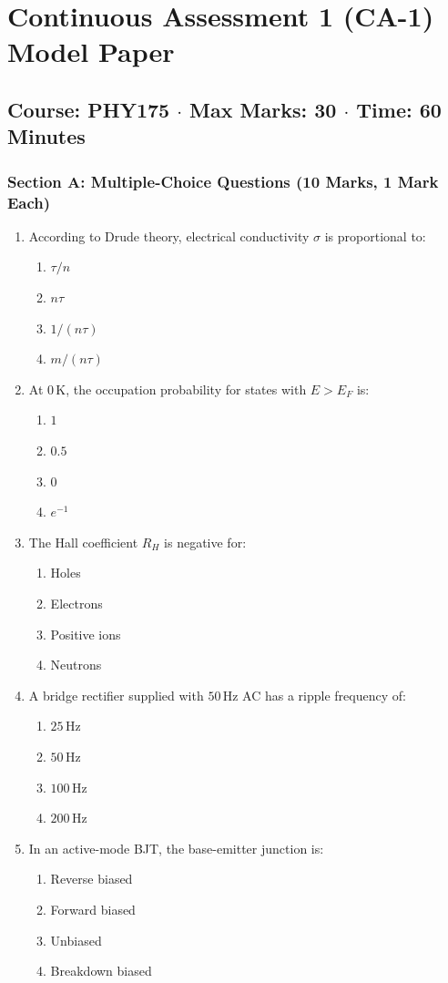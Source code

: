 \chapter{Continuous Assessment 1 (CA-1) Model Paper}
\section*{Course: PHY175 $\cdot$ Max Marks: 30 $\cdot$ Time: 60 Minutes}

\subsection*{Section A: Multiple-Choice Questions (10 Marks, 1 Mark Each)}
\begin{enumerate}[leftmargin=*]
    \item According to Drude theory, electrical conductivity $\sigma$ is proportional to:
    \begin{enumerate}[label=(\alph*)]
        \item $\tau / n$ \item $n \tau$ \item $1/(n\tau)$ \item $m / (n\tau)$
    \end{enumerate}
    \item At $0\,\text{K}$, the occupation probability for states with $E > E_F$ is:
    \begin{enumerate}[label=(\alph*)]
        \item $1$ \item $0.5$ \item $0$ \item $e^{-1}$
    \end{enumerate}
    \item The Hall coefficient $R_H$ is negative for:
    \begin{enumerate}[label=(\alph*)]
        \item Holes \item Electrons \item Positive ions \item Neutrons
    \end{enumerate}
    \item A bridge rectifier supplied with $50\,\text{Hz}$ AC has a ripple frequency of:
    \begin{enumerate}[label=(\alph*)]
        \item $25\,\text{Hz}$ \item $50\,\text{Hz}$ \item $100\,\text{Hz}$ \item $200\,\text{Hz}$
    \end{enumerate}
    \item In an active-mode BJT, the base-emitter junction is:
    \begin{enumerate}[label=(\alph*)]
        \item Reverse biased \item Forward biased \item Unbiased \item Breakdown biased
    \end{enumerate}
\end{enumerate}

